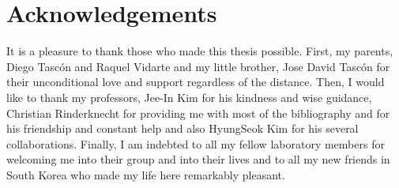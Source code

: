 
\section*{Acknowledgements}

It is a pleasure to thank those who made this thesis possible. First,
my parents, Diego Tascón and Raquel Vidarte and my little brother,
Jose David Tascón for their unconditional love and support regardless
of the distance. Then, I would like to thank my professors,
Jee\hyp{}In Kim for his kindness and wise guidance, Christian
Rinderknecht for providing me with most of the bibliography and for
his friendship and constant help and also HyungSeok Kim for his
several collaborations. Finally, I am indebted to all my fellow
laboratory members for welcoming me into their group and into their
lives and to all my new friends in South Korea who made my life here
remarkably pleasant.

